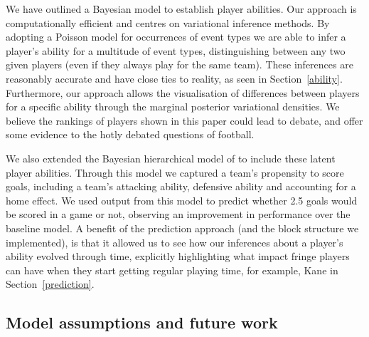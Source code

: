 \documentclass[11pt,a4paper]{article}
\begin{document}
We have outlined a Bayesian model to establish player abilities. 
Our approach is computationally efficient and 
centres on variational inference methods. By adopting a Poisson model 
for occurrences of event types we are able to infer a player's ability 
for a multitude of event types, distinguishing between any two 
given players (even if they always play for the same team). 
These inferences are reasonably 
accurate and have close ties to reality, as seen in 
Section~\ref{ability}. Furthermore, our approach allows the 
visualisation of differences between players for a specific ability 
through the marginal posterior variational densities. We believe 
the rankings of players shown in this paper could lead to debate, and 
offer some evidence to the hotly debated questions of football.

We also extended the Bayesian hierarchical model of \cite{baio_2010} 
to include these latent player abilities. Through this model we 
captured a team's propensity to score goals, including a team's 
attacking ability, defensive ability and accounting for a home effect. 
We used output from this model to predict whether 2.5 goals would be 
scored in a game or not, observing an improvement in performance 
over the baseline model. A benefit of the prediction approach (and the 
block structure we implemented), is that it allowed us to see how our 
inferences about a player's ability evolved through time, explicitly 
highlighting what impact fringe players can have when they start getting 
regular playing time, for example, Kane in Section~\ref{prediction}. 






\subsection*{Model assumptions and future work}
\end{document}
